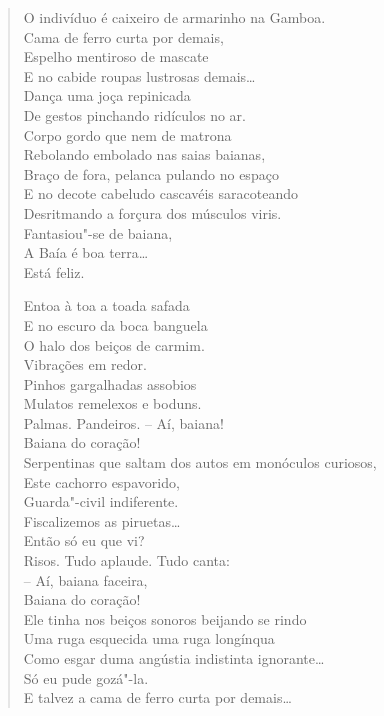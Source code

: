\begin{verse}
O indivíduo é caixeiro de armarinho na Gamboa.\\
Cama de ferro curta por demais,\\
Espelho mentiroso de mascate\\
E no cabide roupas lustrosas demais\ldots{}\\
Dança uma joça repinicada\\
De gestos pinchando ridículos no ar.\\
Corpo gordo que nem de matrona\\
Rebolando embolado nas saias baianas,\\
Braço de fora, pelanca pulando no espaço\\
E no decote cabeludo cascavéis saracoteando\\
Desritmando a forçura dos músculos viris.\\
Fantasiou"-se de baiana,\\
\quad\quad\quad{}A Baía é boa terra\ldots{}\\
\quad\quad\quad\quad\quad{}Está feliz.

Entoa à toa a toada safada\\
E no escuro da boca banguela\\
O halo dos beiços de carmim.\\
Vibrações em redor.\\
Pinhos gargalhadas assobios\\
Mulatos remelexos e boduns.\\
Palmas. Pandeiros. -- Aí, baiana!\\
\quad\quad\quad{}Baiana do coração!\\
Serpentinas que saltam dos autos em monóculos curiosos,\\
Este cachorro espavorido,\\
Guarda"-civil indiferente.\\
Fiscalizemos as piruetas\ldots{}\\
Então só eu que vi?\\
Risos. Tudo aplaude. Tudo canta:\\
\quad\quad{}-- Aí, baiana faceira,\\
\quad\quad{}Baiana do coração!\\
Ele tinha nos beiços sonoros beijando se rindo\\
Uma ruga esquecida uma ruga longínqua\\
Como esgar duma angústia indistinta ignorante\ldots{}\\
Só eu pude gozá"-la.\\
E talvez a cama de ferro curta por demais\ldots{}


\end{verse}
